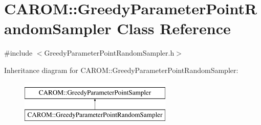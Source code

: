 \hypertarget{class_c_a_r_o_m_1_1_greedy_parameter_point_random_sampler}{\section{C\-A\-R\-O\-M\-:\-:Greedy\-Parameter\-Point\-Random\-Sampler Class Reference}
\label{class_c_a_r_o_m_1_1_greedy_parameter_point_random_sampler}
}


{\ttfamily \#include $<$Greedy\-Parameter\-Point\-Random\-Sampler.\-h$>$}

Inheritance diagram for C\-A\-R\-O\-M\-:\-:Greedy\-Parameter\-Point\-Random\-Sampler\-:\begin{figure}[H]
\begin{center}
\leavevmode
\includegraphics[height=2.000000cm]{class_c_a_r_o_m_1_1_greedy_parameter_point_random_sampler}
\end{center}
\end{figure}
